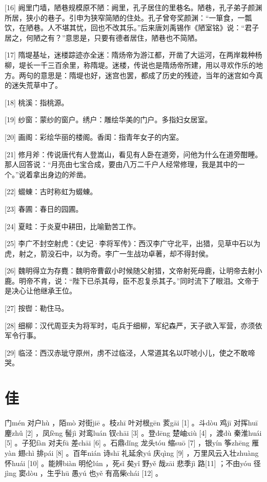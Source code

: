 \documentclass[12pt,UTF8]{ctexbook}
\begin{document}
[16] 阙里门墙，陋巷规模原不陋：阙里，孔子居住的里巷名。陋巷，孔子弟子颜渊所居，狭小的巷子。引申为狭窄简陋的住处。孔子曾夸奖颜渊：“一箪食，一瓢饮，在陋巷。人不堪其忧，回也不改其乐。”后来唐刘禹锡作《陋室铭》说：“君子居之，何陋之有？”意思是，只要有德者居住，陋巷也不简陋。

[17] 隋堤基址，迷楼踪迹亦全迷：隋炀帝为游江都，开凿了大运河，在两岸栽种杨柳，堤长一千三百余里，称隋堤。迷楼，传说也是隋炀帝所建，用以寻欢作乐的地方。两句的意思是：隋堤也好，迷宫也罢，都成了历史的残迹，当年的迷宫如今真的迷失荒草中了。

[18] 桃溪：指桃源。

[19] 纱窗：蒙纱的窗户。绣户：雕绘华美的门户。多指妇女居室。

[20] 画阁：彩绘华丽的楼阁。香闺：指青年女子的内室。

[21] 修月斧：传说唐代有人登嵩山，看见有人卧在道旁，问他为什么在道旁酣睡。那人回答说：“月亮由七宝合成，要由八万二千户人经常修理，我是其中的一个。”说着拿出身边的斧凿。

[22] 蝃蝀：古时称虹为蝃蝀。

[23] 春圃：春日的园圃。

[24] 夏畦：于炎夏中耕田，比喻勤苦工作。

[25] 李广不封空射虎：《史记·李将军传》：西汉李广守北平，出猎，见草中石以为虎，射之，箭没石中，以为奇。李广一生战功卓著，却不得封侯。

[26] 魏明得立为存麑：魏明帝曹叡小时候随父射猎，文帝射死母鹿，让明帝去射小鹿。明帝不肯，说：“陛下已杀其母，臣不忍复杀其子。”同时流下了眼泪。文帝于是决心让他继承王位。

[27] 按辔：勒住马。

[28] 细柳：汉代周亚夫为将军时，屯兵于细柳，军纪森严，天子欲入军营，亦须依军令行事。

[29] 临泾：西汉赤玼守原州，虏不过临泾，人常道其名以吓唬小儿，使之不敢啼哭。





\chapter{佳}


门mén 对户hù ，陌mò 对街jiē 。枝zhī 叶对根gēn 荄gāi [1] 。斗dòu 鸡jī 对挥huī 麈zhǔ [2] ，凤fèng 髻jì 对鸾luán 钗chāi [3] 。登dēng 楚岫xiù [4] ，渡dù 秦淮huái [5] 。子犯fàn 对夫fū 差chāi [6] 。石鼎dǐng 龙头tóu 缩suō [7] ，银yín 筝zhēng 雁yàn 翅chì 排pái [8] 。百年nián 诗shī 礼延余yú 庆qìng [9] ，万里风云入壮zhuàng 怀huái [10] 。能辨biàn 明伦lún ，死sǐ 矣yǐ 野yě 哉zāi 悲季jì 路[11] ；不由yóu 径jìng 窦dòu ，生乎hū 愚yú 也yě 有高柴chái [12] 。
\end{document}
